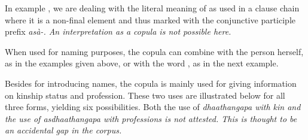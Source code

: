 In example , we are dealing with the literal meaning of  as used in a clause chain where it is a non-final element and thus marked with the conjunctive participle prefix \em asà-\em. An interpretation as a copula is not possible here.

When used for naming purposes, the copula can combine with the person herself, as in the examples given above, or with the word , as in the next example.




Besides for introducing names, the copula is mainly used for giving information on kinship status and profession. These two uses are illustrated below for all three forms, yielding six possibilities. Both the use of \em dhaathangapa \em with kin and the use of \em asdhaathangapa \em with professions is not attested. This is thought to be an accidental gap in the corpus.






